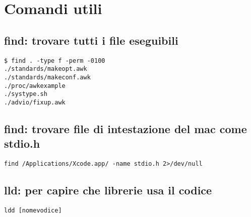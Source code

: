\section{Comandi utili}

\subsection{find: trovare tutti i file eseguibili}
	
\begin{lstlisting}
$ find . -type f -perm -0100
./standards/makeopt.awk
./standards/makeconf.awk
./proc/awkexample
./systype.sh
./advio/fixup.awk
\end{lstlisting}


\subsection{find: trovare file di intestazione del mac come stdio.h}

\begin{lstlisting}
find /Applications/Xcode.app/ -name stdio.h 2>/dev/null
\end{lstlisting}


\subsection{lld: per capire che librerie usa il codice}

\begin{lstlisting}
ldd [nomevodice]
\end{lstlisting}